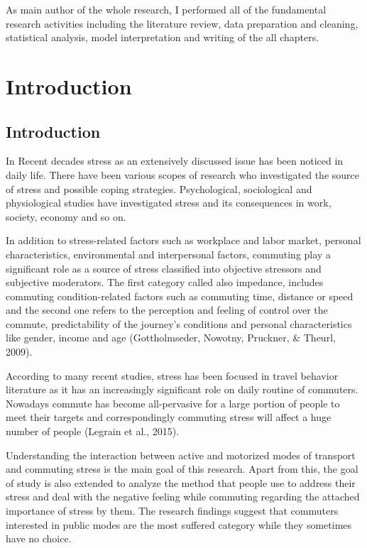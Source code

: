 \documentclass[
11pt, %
oneside, %
english, %
singlespacing, %
]{macthesis} %
\begin{document}
As main author of the whole research, I performed all of the fundamental research activities including the literature review, data preparation and cleaning, statistical analysis, model interpretation and writing of the all chapters.

\hypertarget{introduction}{%
\chapter{Introduction}\label{introduction}}

\hypertarget{introduction-1}{%
\section{Introduction}\label{introduction-1}}

In Recent decades stress as an extensively discussed issue has been noticed in daily life. There have been various scopes of research who investigated the source of stress and possible coping strategies. Psychological, sociological and physiological studies have investigated stress and its consequences in work, society, economy and so on.

In addition to stress-related factors such as workplace and labor market, personal characteristics, environmental and interpersonal factors, commuting play a significant role as a source of stress classified into objective stressors and subjective moderators. The first category called also impedance, includes commuting condition-related factors such as commuting time, distance or speed and the second one refers to the perception and feeling of control over the commute, predictability of the journey's conditions and personal characteristics like gender, income and age (Gottholmseder, Nowotny, Pruckner, \& Theurl, 2009).

According to many recent studies, stress has been focused in travel behavior literature as it has an increasingly significant role on daily routine of commuters. Nowadays commute has become all-pervasive for a large portion of people to meet their targets and correspondingly commuting stress will affect a huge number of people (Legrain et al., 2015).

Understanding the interaction between active and motorized modes of transport and commuting stress is the main goal of this research. Apart from this, the goal of study is also extended to analyze the method that people use to address their stress and deal with the negative feeling while commuting regarding the attached importance of stress by them. The research findings suggest that commuters interested in public modes are the most suffered category while they sometimes have no choice.
\end{document}
